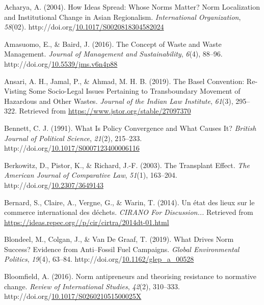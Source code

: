 \documentclass[12pt]{ulaval}
\newenvironment{CSLReferences}%
  {}%
  {\par}
\begin{document}
\label{refs}
\begin{CSLReferences}{1}{0}
Acharya, A. (2004). How {Ideas} {Spread}: {Whose} {Norms} {Matter}? {Norm} {Localization} and {Institutional} {Change} in {Asian} {Regionalism}. \emph{International Organization}, \emph{58}(02). http://doi.org/\href{https://doi.org/10.1017/S0020818304582024}{10.1017/S0020818304582024}

Amasuomo, E., \& Baird, J. (2016). The {Concept} of {Waste} and {Waste} {Management}. \emph{Journal of Management and Sustainability}, \emph{6}(4), 88--96. http://doi.org/\href{https://doi.org/10.5539/jms.v6n4p88}{10.5539/jms.v6n4p88}

Ansari, A. H., Jamal, P., \& Ahmad, M. H. B. (2019). The {Basel} {Convention}: {Re}-{Visting} {Some} {Socio}-{Legal} {Issues} {Pertaining} to {Transboundary} {Movement} of {Hazardous} and {Other} {Wastes}. \emph{Journal of the Indian Law Institute}, \emph{61}(3), 295--322. Retrieved from \url{https://www.jstor.org/stable/27097370}

Bennett, C. J. (1991). What {Is} {Policy} {Convergence} and {What} {Causes} {It}? \emph{British Journal of Political Science}, \emph{21}(2), 215--233. http://doi.org/\href{https://doi.org/10.1017/S0007123400006116}{10.1017/S0007123400006116}

Berkowitz, D., Pistor, K., \& Richard, J.-F. (2003). The {Transplant} {Effect}. \emph{The American Journal of Comparative Law}, \emph{51}(1), 163--204. http://doi.org/\href{https://doi.org/10.2307/3649143}{10.2307/3649143}

Bernard, S., Claire, A., Vergne, G., \& Warin, T. (2014). Un état des lieux sur le commerce international des déchets. \emph{CIRANO For Discussion...} Retrieved from \url{https://ideas.repec.org//p/cir/cirtra/2014dt-01.html}

Blondeel, M., Colgan, J., \& Van De Graaf, T. (2019). What {Drives} {Norm} {Success}? {Evidence} from {Anti}--{Fossil} {Fuel} {Campaigns}. \emph{Global Environmental Politics}, \emph{19}(4), 63--84. http://doi.org/\href{https://doi.org/10.1162/glep_a_00528}{10.1162/glep\_a\_00528}

Bloomfield, A. (2016). Norm antipreneurs and theorising resistance to normative change. \emph{Review of International Studies}, \emph{42}(2), 310--333. http://doi.org/\href{https://doi.org/10.1017/S026021051500025X}{10.1017/S026021051500025X}


\end{CSLReferences}
\end{document}
